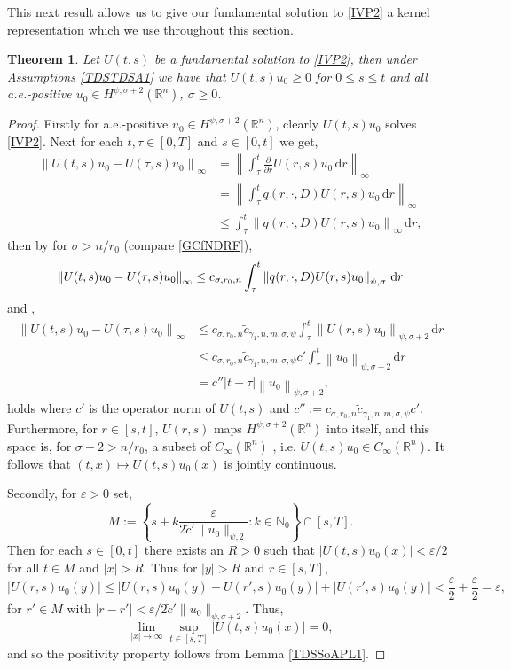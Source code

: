 \documentclass[a4paper, 12pt]{report}
\newtheorem{theorem}{Theorem}[section]
\theoremstyle{remark}
\theoremstyle{definition}
\begin{document}
This next result allows us to give our fundamental solution to \eqref{IVP2} a kernel representation which we use throughout this section.
\begin{theorem}\label{TDSSoAPT1}
Let $U(t, s)$ be a fundamental solution to \eqref{IVP2}, then under Assumptions \ref{TDSTDSA1} we have that $U(t, s)u_0 \ge 0$ for $0 \le s \le t$ and all a.e.-positive $u_0 \in H^{\psi, \sigma + 2}(\mathbb{R}^n)$, $\sigma \ge 0$.
\end{theorem}
\begin{proof}
Firstly for a.e.-positive $u_0 \in H^{\psi, \sigma + 2}(\mathbb{R}^n)$, clearly $U(t, s)u_0$ solves \eqref{IVP2}.  Next for each $t, \tau \in [0, T]$ and $s \in [0, t]$ we get,
$$
\begin{aligned}
\left\|U(t, s)u_0 - U(\tau, s)u_0\right\|_\infty & = \left\|\int_\tau ^t\frac{\partial}{\partial r}U(r, s)u_0\,\mathrm{d}r\right\|_\infty\\
& = \left\|\int_\tau ^tq(r, \cdot, D)U(r, s)u_0\,\mathrm{d}r\right\|_\infty\\
& \le \int_\tau^t\left\|q(r, \cdot, D)U(r, s)u_0\right\|_\infty\,\mathrm{d}r,
\end{aligned}
$$
then by \cite[Section 7]{RZ} for $\sigma > n/r_0$ (compare \eqref{GCfNDRF}),
$$
\left\|U(t, s)u_0 - U(\tau, s)u_0\right\|_\infty \le c_{\sigma, r_0, n}\int_\tau^t\left\|q(r, \cdot, D)U(r, s)u_0\right\|_{\psi, \sigma}\,\mathrm{d}r\\
$$
and \cite[Proposition 6.6 + Theorem 6.11]{RZ},
$$
\begin{aligned}
\left\|U(t, s)u_0 - U(\tau, s)u_0\right\|_\infty & \le c_{\sigma, r_0, n}\tilde{c}_{\gamma_1, n, m, \sigma, \psi}\int_\tau^t\left\|U(r, s)u_0\right\|_{\psi, \sigma + 2}\,\mathrm{d}r\\
& \le c_{\sigma, r_0, n}\tilde{c}_{\gamma_1, n, m, \sigma, \psi}c'\int_\tau ^t\left\|u_0\right\|_{\psi, \sigma + 2}\,\mathrm{d}r\\
& = c''|t - \tau|\left\|u_0\right\|_{\psi, \sigma + 2},
\end{aligned}
$$
holds where $c'$ is the operator norm of $U(t, s)$ and $c'' := c_{\sigma, r_0, n}\tilde{c}_{\gamma_1, n, m, \sigma, \psi}c'$.  Furthermore, for $ r \in [s, t]$, $U(r, s)$ maps $H^{\psi, \sigma + 2}(\mathbb{R}^n)$ into itself, and this space is, for $\sigma + 2 > n/r_0$, a subset of $C_\infty(\mathbb{R}^n)$ \cite[Section 2.6]{Vol2}, i.e. $U(t, s)u_0 \in C_\infty(\mathbb{R}^n)$.  It follows that $(t, x) \mapsto U(t, s)u_0(x)$ is jointly continuous.

Secondly, for $\varepsilon > 0$ set,
$$
M := \left\{s + k\frac{\varepsilon}{2\tilde{c}'\|u_0\|_{\psi, 2}} : k \in \mathbb{N}_0\right\} \cap [s, T].
$$
Then for each $s \in [0, t]$ there exists an $R > 0$ such that $|U(t, s)u_0(x)| < \varepsilon/2$ for all $t \in M$ and $|x| > R$.  Thus for $|y| > R$ and $r \in [s, T]$,
$$
|U(r, s)u_0(y)| \le |U(r, s)u_0(y) - U(r', s)u_0(y)| + |U(r', s)u_0(y)| < \frac{\varepsilon}{2} + \frac{\varepsilon}{2} = \varepsilon,
$$
for $r' \in M$ with $|r - r'| < \varepsilon/2\tilde{c}'\|u_0\|_{\psi, \sigma + 2}$.  Thus,
$$
\lim_{|x| \to \infty}\sup_{t \in [s, T]}|U(t, s)u_0(x)| = 0,
$$
and so the positivity property follows from Lemma \ref{TDSSoAPL1}.
\end{proof}
\end{document}

